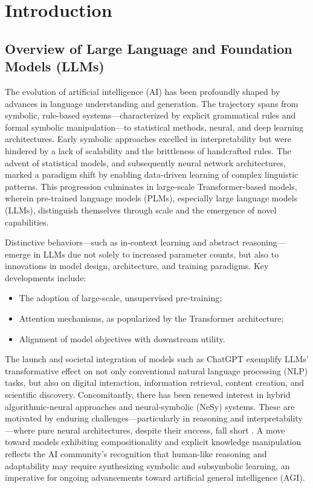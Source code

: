 \section{Introduction}

\subsection{Overview of Large Language and Foundation Models (LLMs)}

The evolution of artificial intelligence (AI) has been profoundly shaped by advances in language understanding and generation. The trajectory spans from symbolic, rule-based systems—characterized by explicit grammatical rules and formal symbolic manipulation—to statistical methods, neural, and deep learning architectures. Early symbolic approaches excelled in interpretability but were hindered by a lack of scalability and the brittleness of handcrafted rules. The advent of statistical models, and subsequently neural network architectures, marked a paradigm shift by enabling data-driven learning of complex linguistic patterns. This progression culminates in large-scale Transformer-based models, wherein pre-trained language models (PLMs), especially large language models (LLMs), distinguish themselves through scale and the emergence of novel capabilities.

Distinctive behaviors—such as in-context learning and abstract reasoning—emerge in LLMs due not solely to increased parameter counts, but also to innovations in model design, architecture, and training paradigms. Key developments include:

\begin{itemize}
    \item The adoption of large-scale, unsupervised pre-training;
    \item Attention mechanisms, as popularized by the Transformer architecture;
    \item Alignment of model objectives with downstream utility.
\end{itemize}

The launch and societal integration of models such as ChatGPT exemplify LLMs' transformative effect on not only conventional natural language processing (NLP) tasks, but also on digital interaction, information retrieval, content creation, and scientific discovery. Concomitantly, there has been renewed interest in hybrid algorithmic-neural approaches and neural-symbolic (NeSy) systems. These are motivated by enduring challenges—particularly in reasoning and interpretability—where pure neural architectures, despite their success, fall short \cite{ref42,ref49,ref54,ref86}. A move toward models exhibiting compositionality and explicit knowledge manipulation reflects the AI community’s recognition that human-like reasoning and adaptability may require synthesizing symbolic and subsymbolic learning, an imperative for ongoing advancements toward artificial general intelligence (AGI).

